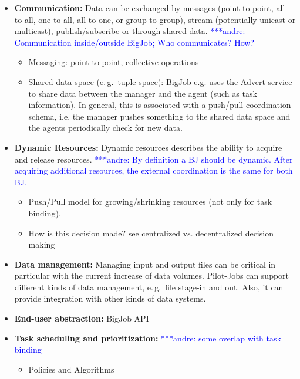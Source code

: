\documentclass[]{article}
\newcommand{\alnote}[1]{ {\textcolor{blue} { ***andre: #1 }}}
\newcommand{\alnote}[1]{}
\begin{document}
\begin{itemize}
\begin{itemize}
\begin{tabular}{|l|c|c|}
			\end{tabular}

	\end{itemize}	
	\item \textbf{Communication:} Data can be exchanged by messages
(point-to-point, all-to-all, one-to-all, all-to-one, or group-to-group),
stream (potentially unicast or multicast), publish/subscribe or through shared
data. \alnote{Communication inside/outside BigJob; Who communicates? How?}
	\begin{itemize}
		\item Messaging: point-to-point, collective operations
		\item Shared data space (e.\,g.\ tuple space): BigJob e.g. uses the Advert service to share data between the manager and the agent (such as task information). In general, this is associated with a push/pull coordination schema, i.e. the manager pushes something to the shared data space and the agents periodically check for new data.
	\end{itemize} 
	\item \textbf{Dynamic Resources:} Dynamic resources describes the ability to acquire and release resources.
	    \alnote{By definition a BJ should be dynamic. After acquiring additional 
	    resources, the external coordination is the same for both BJ.}
		\begin{itemize}
			\item Push/Pull model for growing/shrinking resources 
			(not only for task binding).
			\item How is this decision made? see centralized vs. decentralized decision making
		\end{itemize}
	\item \textbf{Data management:} Managing input and output files can be critical in particular with the current increase of data volumes. Pilot-Jobs can support different kinds of data management, e.\,g.\ file stage-in and out. Also, it can provide integration with other kinds of data systems.
	\item \textbf{End-user abstraction:} BigJob API
	\item \textbf{Task scheduling and prioritization:}\alnote{some overlap with 
	task binding}
	\begin{itemize}
	 			\item Policies and Algorithms

\end{itemize}
\end{itemize}
\end{document}
